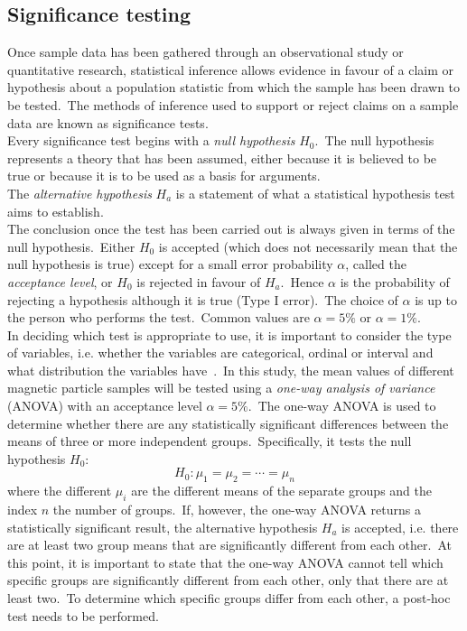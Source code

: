 \subsection{Significance testing}\label{subsec:significanceTesting}
Once sample data has been gathered through an observational study or quantitative research, statistical inference allows evidence in favour of a claim or hypothesis about a population statistic from which the sample has been drawn to be tested.\ The methods of inference used to support or reject claims on a sample data are known as significance tests.\\
Every significance test begins with a \textit{null hypothesis} $H_{0}$.\ The null hypothesis represents a theory that has been assumed, either because it is believed to be true or because it is to be used as a basis for arguments.\\
The \textit{alternative hypothesis} $H_{a}$ is a statement of what a statistical hypothesis test aims to establish.\\
The conclusion once the test has been carried out is always given in terms of the null hypothesis.\ Either $H_{0}$ is accepted (which does not necessarily mean that the null hypothesis is true) except for a small error probability $\alpha$, called the \textit{acceptance level}, or $H_{0}$ is rejected in favour of $H_{a}$.\ Hence $\alpha$ is the probability of rejecting a hypothesis although it is true (Type I error).\ The choice of $\alpha$ is up to the person who performs the test.\ Common values are $\alpha = 5\%$ or $\alpha = 1\%$.\\
In deciding which test is appropriate to use, it is important to consider the type of variables, i.e. whether the variables are categorical, ordinal or interval and what distribution the variables have~\cite{Kreyszig2006,Mohr1990}.\ In this study, the mean values of different magnetic particle samples will be tested using a \textit{one-way analysis of variance} (ANOVA) with an acceptance level $\alpha = 5\%$.\ The one-way ANOVA is used to determine whether there are any statistically significant differences between the means of three or more independent groups.\ Specifically, it tests the null hypothesis $H_{0}$:\
\begin{equation}
	H_{0}: \mu_{1} = \mu_{2} = \cdots = \mu_{n}
\end{equation}
where the different $\mu_{i}$ are the different means of the separate groups and the index $n$ the number of groups.\ If, however, the one-way ANOVA returns a statistically significant result, the alternative hypothesis $H_{a}$ is accepted, i.e. there are at least two group means that are significantly different from each other.\ At this point, it is important to state that the one-way ANOVA cannot tell which specific groups are significantly different from each other, only that there are at least two.\ To determine which specific groups differ from each other, a post-hoc test needs to be performed.\\
